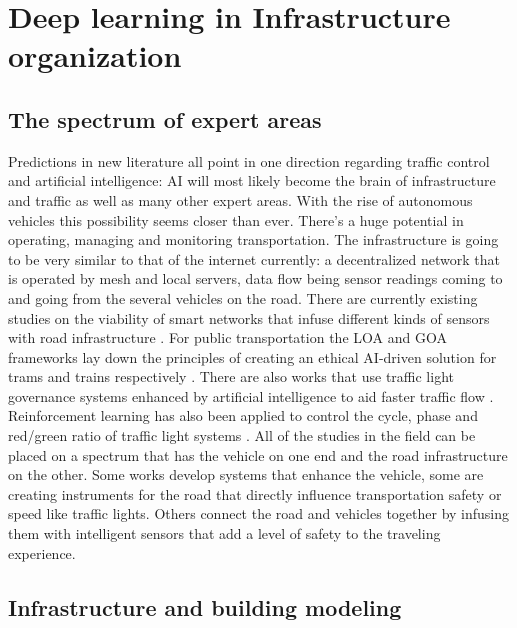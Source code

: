 \documentclass[
]{elteikthesis}[2023/04/10]
\begin{document}
\section{Deep learning in Infrastructure organization}

\subsection{The spectrum of expert areas}

Predictions in new literature all point in one direction regarding
traffic control and artificial intelligence: AI will most likely become
the brain of infrastructure and traffic as well as many other expert
areas. With the rise of autonomous vehicles this possibility seems
closer than ever. There's a huge potential in operating, managing
and monitoring transportation. The infrastructure is going to be very
similar to that of the internet currently: a decentralized network
that is operated by mesh and local servers, data flow being sensor
readings coming to and going from the several vehicles on the road.
There are currently existing studies on the viability of smart networks
that infuse different kinds of sensors with road infrastructure \cite{hoult2009wireless}.
For public transportation the LOA and GOA frameworks lay down the
principles of creating an ethical AI-driven solution for trams and
trains respectively \cite{salo2021ai}. There are also works that
use traffic light governance systems enhanced by artificial intelligence
to aid faster traffic flow \cite{sukhadia2020optimization}. Reinforcement
learning has also been applied to control the cycle, phase and red/green
ratio of traffic light systems \cite{wei2021recent}. All of the studies
in the field can be placed on a spectrum that has the vehicle on one
end and the road infrastructure on the other. Some works develop systems
that enhance the vehicle, some are creating instruments for the road
that directly influence transportation safety or speed like traffic lights.
Others connect the road and vehicles together by infusing them with
intelligent sensors that add a level of safety to the traveling experience. 

\subsection{Infrastructure and building modeling}
\end{document}
